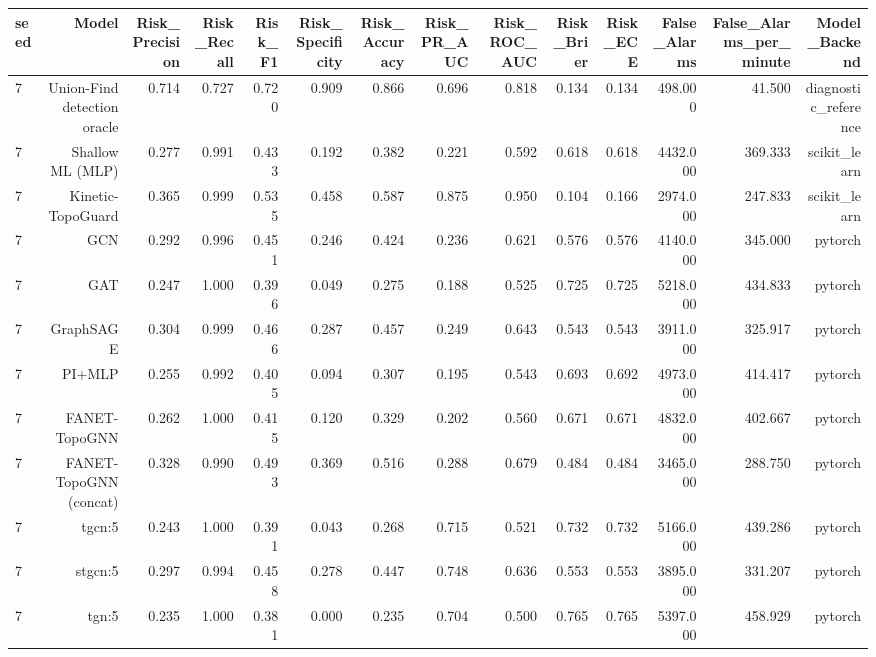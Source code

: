 \begin{tabular}{lrrrrrrrrrrrrr}
\toprule
seed & Model & Risk\_Precision & Risk\_Recall & Risk\_F1 & Risk\_Specificity & Risk\_Accuracy & Risk\_PR\_AUC & Risk\_ROC\_AUC & Risk\_Brier & Risk\_ECE & False\_Alarms & False\_Alarms\_per\_minute & Model\_Backend \\
\midrule
7 & Union-Find detection oracle & 0.714 & 0.727 & 0.720 & 0.909 & 0.866 & 0.696 & 0.818 & 0.134 & 0.134 & 498.000 & 41.500 & diagnostic\_reference \\
7 & Shallow ML (MLP) & 0.277 & 0.991 & 0.433 & 0.192 & 0.382 & 0.221 & 0.592 & 0.618 & 0.618 & 4432.000 & 369.333 & scikit\_learn \\
7 & Kinetic-TopoGuard & 0.365 & 0.999 & 0.535 & 0.458 & 0.587 & 0.875 & 0.950 & 0.104 & 0.166 & 2974.000 & 247.833 & scikit\_learn \\
7 & GCN & 0.292 & 0.996 & 0.451 & 0.246 & 0.424 & 0.236 & 0.621 & 0.576 & 0.576 & 4140.000 & 345.000 & pytorch \\
7 & GAT & 0.247 & 1.000 & 0.396 & 0.049 & 0.275 & 0.188 & 0.525 & 0.725 & 0.725 & 5218.000 & 434.833 & pytorch \\
7 & GraphSAGE & 0.304 & 0.999 & 0.466 & 0.287 & 0.457 & 0.249 & 0.643 & 0.543 & 0.543 & 3911.000 & 325.917 & pytorch \\
7 & PI+MLP & 0.255 & 0.992 & 0.405 & 0.094 & 0.307 & 0.195 & 0.543 & 0.693 & 0.692 & 4973.000 & 414.417 & pytorch \\
7 & FANET-TopoGNN & 0.262 & 1.000 & 0.415 & 0.120 & 0.329 & 0.202 & 0.560 & 0.671 & 0.671 & 4832.000 & 402.667 & pytorch \\
7 & FANET-TopoGNN (concat) & 0.328 & 0.990 & 0.493 & 0.369 & 0.516 & 0.288 & 0.679 & 0.484 & 0.484 & 3465.000 & 288.750 & pytorch \\
7 & tgcn:5 & 0.243 & 1.000 & 0.391 & 0.043 & 0.268 & 0.715 & 0.521 & 0.732 & 0.732 & 5166.000 & 439.286 & pytorch \\
7 & stgcn:5 & 0.297 & 0.994 & 0.458 & 0.278 & 0.447 & 0.748 & 0.636 & 0.553 & 0.553 & 3895.000 & 331.207 & pytorch \\
7 & tgn:5 & 0.235 & 1.000 & 0.381 & 0.000 & 0.235 & 0.704 & 0.500 & 0.765 & 0.765 & 5397.000 & 458.929 & pytorch \\
\bottomrule
\end{tabular}